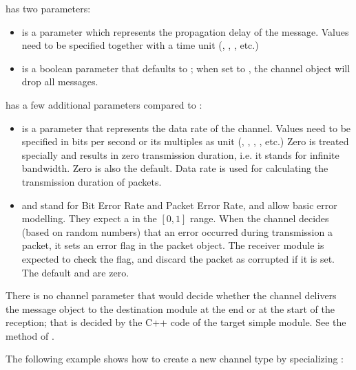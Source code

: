 has two parameters:

\begin{itemize}
    \item {} is a  parameter which represents the
          propagation delay of the message. Values need to be specified
          together with a time unit (, , , etc.)
    \item {} is a boolean parameter that defaults to ;
          when set to , the channel object will drop all messages.
\end{itemize}

 has a few additional parameters compared to :

\begin{itemize}
    \item {} is a  parameter that represents the
          data rate of the channel. Values need to be specified
          in bits per second or its multiples as unit (,
          , , , etc.) Zero is treated
          specially and results in zero transmission duration, i.e.
          it stands for infinite bandwidth. Zero is also the default.
          Data rate is used for calculating the transmission duration of
          packets.
    \item {} and  stand for Bit Error Rate and Packet Error Rate,
          and allow basic error modelling. They expect a 
          in the $[0,1]$ range. When the channel decides (based on random
          numbers) that an error occurred during transmission a packet,
          it sets an error flag in the packet object. The receiver
          module is expected to check the flag, and discard the packet
          as corrupted if it is set. The default  and 
          are zero.
\end{itemize}

\begin{note}
    There is no channel parameter that would decide whether the channel
    delivers the message object to the destination module at the end or
    at the start of the reception; that is decided by the C++ code
    of the target simple module. See the 
    method of .
\end{note}

The following example shows how to create a new channel type by
specializing :

